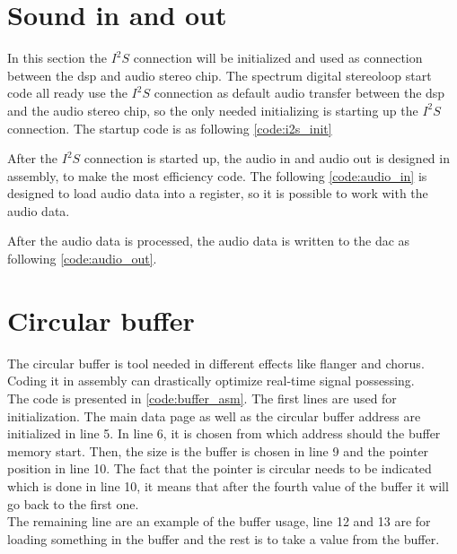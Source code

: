 \section{Sound in and out}
In this section the $I^2S$ connection will be initialized and used as connection between the \gls{dsp} and audio stereo chip. The spectrum digital stereoloop start code all ready use the $I^2S$ connection as default audio transfer between the \gls{dsp} and the audio stereo chip, so the only needed initializing is starting up the $I^2S$ connection. The startup code is as following \autoref{code:i2s_init}

After the $I^2S$ connection is started up, the audio in and audio out is designed in assembly, to make the most efficiency code. The following \autoref{code:audio_in} is designed to load audio data into a register, so it is possible to work with the audio data. 

After the audio data is processed, the audio data is written to the \gls{dac} as following \autoref{code:audio_out}.

\section{Circular buffer}

The circular buffer is tool needed in different effects like flanger and chorus. Coding it in assembly can drastically optimize real-time signal possessing. \\

The code is presented in \autoref{code:buffer_asm}. The first lines are used for initialization. The main data page as well as the circular buffer address are initialized in line 5. In line 6, it is chosen from which address should the buffer memory start. Then, the size is the buffer is chosen in line 9 and the pointer position in line 10. The fact that the pointer is circular needs to be indicated which is done in line 10, it means that after the fourth value of the buffer it will go back to the first one.\\

The remaining line are an example of the buffer usage, line 12 and 13 are for loading something in the buffer and the rest is to take a value from the buffer. 







